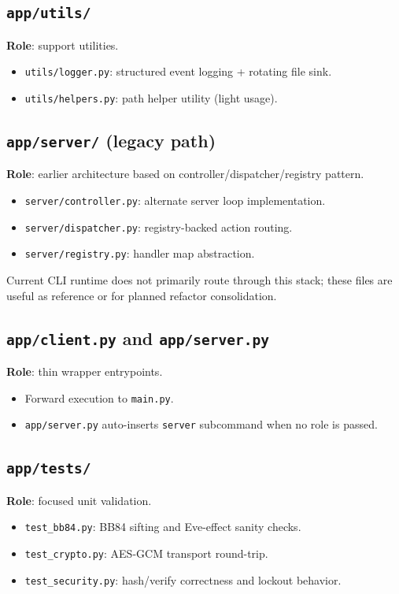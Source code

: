 \documentclass[11pt,a4paper]{article}
\begin{document}
\subsection{\texttt{app/utils/}}
\textbf{Role}: support utilities.
\begin{itemize}[leftmargin=1.4em]
  \item \texttt{utils/logger.py}: structured event logging + rotating file sink.
  \item \texttt{utils/helpers.py}: path helper utility (light usage).
\end{itemize}

\subsection{\texttt{app/server/} (legacy path)}
\textbf{Role}: earlier architecture based on controller/dispatcher/registry pattern.
\begin{itemize}[leftmargin=1.4em]
  \item \texttt{server/controller.py}: alternate server loop implementation.
  \item \texttt{server/dispatcher.py}: registry-backed action routing.
  \item \texttt{server/registry.py}: handler map abstraction.
\end{itemize}
Current CLI runtime does not primarily route through this stack; these files are useful as reference or for planned refactor consolidation.

\subsection{\texttt{app/client.py} and \texttt{app/server.py}}
\textbf{Role}: thin wrapper entrypoints.
\begin{itemize}[leftmargin=1.4em]
  \item Forward execution to \texttt{main.py}.
  \item \texttt{app/server.py} auto-inserts \texttt{server} subcommand when no role is passed.
\end{itemize}

\subsection{\texttt{app/tests/}}
\textbf{Role}: focused unit validation.
\begin{itemize}[leftmargin=1.4em]
  \item \texttt{test\_bb84.py}: BB84 sifting and Eve-effect sanity checks.
  \item \texttt{test\_crypto.py}: AES-GCM transport round-trip.
  \item \texttt{test\_security.py}: hash/verify correctness and lockout behavior.
\end{itemize}
\end{document}

